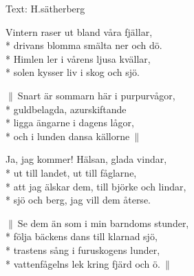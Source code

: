 \begin{SongText}
    \begin{SongInfo}
        Text: H.sätherberg
    \end{SongInfo}
    \begin{SongVerse}
        Vintern raser ut bland våra fjällar,\\*%
        drivans blomma smälta ner och dö.\\*%
        Himlen ler i vårens ljusa kvällar,\\*%
        solen kysser liv i skog och sjö.
    \end{SongVerse}
    \begin{SongVerse}
        $\|\:$Snart är sommarn här i purpurvågor,\\*%
        guldbelagda, azurskiftande\\*%
        ligga ängarne i dagens lågor,\\*%
        och i lunden dansa källorne$\:\|$
    \end{SongVerse}
    \begin{SongVerse}
        Ja, jag kommer! Hälsan, glada vindar,\\*%
        ut till landet, ut till fåglarne,\\*%
        att jag älskar dem, till björke och lindar,\\*%
        sjö och berg, jag vill dem återse.
    \end{SongVerse}
    \begin{SongVerse}
        $\|\:$Se dem än som i min barndoms stunder,\\*%
        följa bäckens dans till klarnad sjö,\\*%
        trastens sång i furuskogens lunder,\\*%
        vattenfågelns lek kring fjärd och ö.$\:\|$
    \end{SongVerse}
\end{SongText}